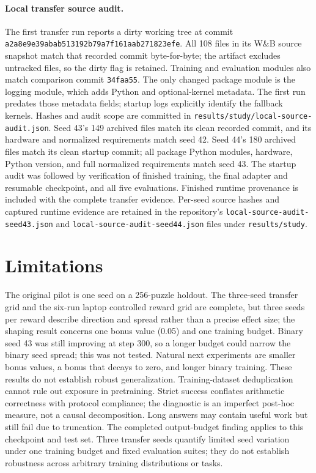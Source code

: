 \documentclass[11pt]{article}
\begin{document}
\paragraph{Local transfer source audit.}
The first transfer run reports a dirty working tree at commit
\texttt{a2a8e9e39abab513192b79a7f161aab271823efe}. All 108 files in its
W\&B source snapshot match that recorded commit byte-for-byte; the artifact
excludes untracked files, so the dirty flag is retained. Training and evaluation
modules also match comparison commit \texttt{34faa55}. The only changed package
module is the logging module, which adds Python and optional-kernel metadata.
The first run predates those metadata fields; startup logs explicitly identify
the fallback kernels. Hashes and audit scope are committed in
\texttt{results/study/local-source-audit.json}.
Seed 43's 149 archived files match its clean recorded commit, and its hardware
and normalized requirements match seed 42. Seed 44's 180 archived files match
its clean startup commit; all package Python modules, hardware, Python version,
and full normalized requirements match seed 43. The startup audit was followed by verification of finished training, the final
adapter and resumable checkpoint, and all five evaluations. Finished runtime
provenance is included with the complete transfer evidence.
Per-seed source hashes and captured runtime evidence are retained in the
repository's \texttt{local-source-audit-seed43.json} and
\texttt{local-source-audit-seed44.json} files under \texttt{results/study}.

\section{Limitations}
The original pilot is one seed on a 256-puzzle holdout. The three-seed transfer
grid and the six-run laptop controlled reward grid are complete, but three seeds per reward describe direction and spread rather than a precise effect size; the shaping result concerns one bonus value (0.05) and one training budget. Binary seed 43 was still improving at step 300, so a longer budget could narrow the binary seed spread; this was not tested. Natural next experiments are smaller bonus values, a bonus that decays to zero, and longer binary training. These results do not establish robust generalization. Training-dataset
deduplication cannot rule out exposure in pretraining. Strict success conflates
arithmetic correctness with protocol compliance; the diagnostic is an imperfect
post-hoc measure, not a causal decomposition. Long answers may contain useful
work but still fail due to truncation. The completed output-budget finding applies
to this checkpoint and test set. Three transfer seeds quantify limited seed
variation under one training budget and fixed evaluation suites; they do not
establish robustness across arbitrary training distributions or tasks.
\end{document}
